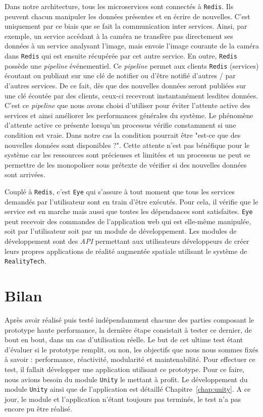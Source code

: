Dans notre architecture, tous les microservices sont connectés à \texttt{Redis}. Ils peuvent chacun manipuler les données présentes et en écrire de nouvelles. C'est uniquement par ce biais que se fait la communication inter services. Ainsi, par exemple, un service accédant à la caméra ne transfère pas directement ses données à un service analysant l'image, mais envoie l'image courante de la caméra dans \texttt{Redis} qui est ensuite récupérée par cet autre service. En outre, \texttt{Redis} possède une \emph{pipeline} événementiel. Ce \emph{pipeline} permet aux clients \texttt{Redis} (services) écoutant ou publiant sur une clé de notifier ou d'être notifié d'autres / par d'autres services. De ce fait, dès que des nouvelles données seront publiées sur une clé écoutée par des clients, ceux-ci recevront instantanément lesdites données. C'est ce \emph{pipeline} que nous avons choisi d'utiliser pour éviter l'attente active des services et ainsi améliorer les performances générales du système.
Le phénomène d'attente active ce présente lorsqu'un processus vérifie constamment si une condition est vraie. Dans notre cas la condition pourrait être "est-ce que des nouvelles données sont disponibles ?". Cette attente n'est pas bénéfique pour le système car les ressources sont précieuses et limitées et un processus ne peut se permettre de les monopoliser sous prétexte de vérifier si des nouvelles données sont arrivées.

Couplé à \texttt{Redis}, c'est \texttt{Eye} qui s'assure à tout moment que tous les services demandés par l'utilisateur sont en train d'être exécutés. Pour cela, il vérifie que le service est en marche mais aussi que toutes les dépendances sont satisfaites. \texttt{Eye} peut recevoir des commandes de l'application web qui est elle-même manipulée, soit par l'utilisateur soit par un module de développement. Les modules de développement sont des \emph{API} permettant aux utilisateurs développeurs de créer leurs propres applications de réalité augmentée spatiale utilisant le système de \texttt{RealityTech}.

\section{Bilan}
Après avoir réalisé puis testé indépendamment chacune des parties composant le prototype haute performance, la dernière étape consistait à tester ce dernier, de bout en bout, dans un cas d'utilisation réelle. Le but de cet ultime test étant d'évaluer si le prototype remplit, ou non, les objectifs que nous nous sommes fixés à savoir : performance, réactivité, modularité et maintenabilité. 
Pour effectuer ce test, il fallait développer une application utilisant ce prototype. Pour ce faire, nous avions besoin du module \texttt{Unity} le mettant à profit. Le développement du module \texttt{Unity} ainsi que de l'application est détaillé Chapitre~\ref{chap:unity}.
A ce jour, le module et l'application n'étant toujours pas terminés, le test n'a pas encore pu être réalisé.